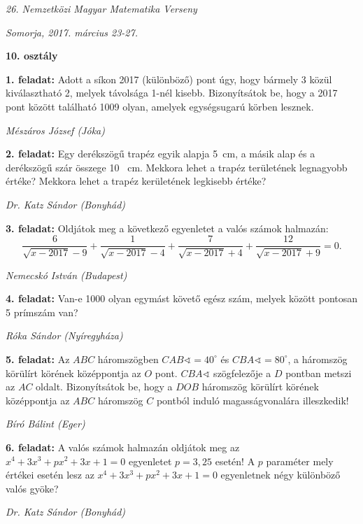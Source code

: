 \documentclass[a4paper,10pt]{article}
\newcommand{\ki}[2]{\hfill {\it #1 (#2)}\medskip}
\begin{document}
\begin{center} \Large {\em 26. Nemzetközi Magyar Matematika Verseny} \end{center}
\begin{center} \large{\em Somorja, 2017. március 23-27.} \end{center}
\smallskip
\begin{center} \large{\bf 10. osztály} \end{center}
\bigskip 

{\bf 1. feladat: } Adott a síkon 2017 (különböző) pont úgy, hogy bármely 3 közül kiválasztható 2, melyek távolsága 1-nél
kisebb. Bizonyítsátok be, hogy a 2017 pont között található 1009 olyan, amelyek egységsugarú körben lesznek.

\ki{Mészáros József}{Jóka}\medskip

{\bf 2. feladat: } Egy derékszögű trapéz egyik alapja 5~cm, a másik alap és a derékszögű szár összege 10~ cm. Mekkora lehet a
trapéz területének legnagyobb értéke? Mekkora lehet a trapéz kerületének legkisebb értéke?

\ki{Dr. Katz Sándor}{Bonyhád}\medskip

{\bf 3. feladat: } Oldjátok meg a következő egyenletet a valós számok halmazán:
$$\frac{6}{\sqrt{x-2017}-9}+
\frac{1}{\sqrt{x-2017}-4}+
\frac{7}{\sqrt{x-2017}+4}+
\frac{12}{\sqrt{x-2017}+9}=0.
$$

\ki{Nemecskó István}{Budapest}\medskip

{\bf 4. feladat: } Van-e 1000 olyan egymást követő egész szám, melyek között pontosan 5 prímszám van?

\ki{Róka Sándor}{Nyíregyháza}\medskip

{\bf 5. feladat: } Az $ABC$ háromszögben
$CAB\sphericalangle=40^\circ$
és
$CBA\sphericalangle=80^\circ$, a háromszög körülírt körének középpontja az $O$ pont.
$CBA\sphericalangle$ szögfelezője a $D$
pontban metszi az $AC$
oldalt. Bizonyítsátok be, hogy a $DOB$
háromszög körülírt
körének középpontja az $ABC$
háromszög $C$ pontból induló magasságvonalára illeszkedik!

\ki{Bíró Bálint}{Eger}\medskip

{\bf 6. feladat: } A valós számok halmazán oldjátok meg az $x^4+3x^3+px^2+3x+1=0$ egyenletet 
$p=3{,}25$ esetén! A $p$
paraméter mely értékei esetén lesz az 
$x^4+3x^3+px^2+3x+1=0$
egyenletnek négy különböző valós gyöke?

\ki{Dr. Katz Sándor}{Bonyhád}\medskip
\end{document}
